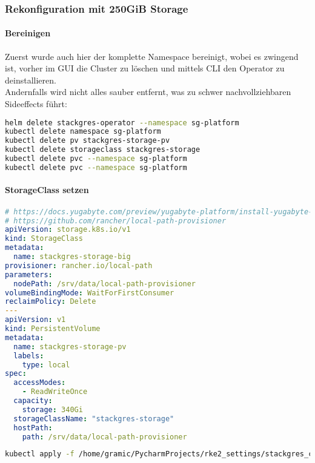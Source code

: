 \subsubsection{Rekonfiguration mit 250GiB Storage}
\paragraph{Bereinigen}
Zuerst wurde auch hier der komplette Namespace bereinigt, wobei es zwingend ist, vorher im GUI die Cluster zu löschen und mittels CLI den Operator zu deinstallieren.\\
Andernfalls wird nicht alles sauber entfernt, was zu schwer nachvollziehbaren Sideeffects führt:
\lstset{style=gra_codestyle}
\begin{lstlisting}[language=bash, caption=StackGres-Citus - Deinstallieren,captionpos=b,label={lst:stackgres_citus-deinstall-cleanup},breaklines=true]
helm delete stackgres-operator --namespace sg-platform
kubectl delete namespace sg-platform
kubectl delete pv stackgres-storage-pv
kubectl delete storageclass stackgres-storage
kubectl delete pvc --namespace sg-platform
kubectl delete pvc --namespace sg-platform
\end{lstlisting}

\paragraph{StorageClass setzen}
\lstset{style=gra_codestyle}
\begin{lstlisting}[language=yaml, caption=StackGres-Citus - StorageClass setzen,captionpos=b,label={lst:storageclass_big.yaml},breaklines=true]
# https://docs.yugabyte.com/preview/yugabyte-platform/install-yugabyte-platform/prepare-environment/kubernetes/#configure-storage-class
# https://github.com/rancher/local-path-provisioner
apiVersion: storage.k8s.io/v1
kind: StorageClass
metadata:
  name: stackgres-storage-big
provisioner: rancher.io/local-path
parameters:
  nodePath: /srv/data/local-path-provisioner
volumeBindingMode: WaitForFirstConsumer
reclaimPolicy: Delete
---
apiVersion: v1
kind: PersistentVolume
metadata:
  name: stackgres-storage-pv
  labels:
    type: local
spec:
  accessModes:
    - ReadWriteOnce
  capacity:
    storage: 340Gi
  storageClassName: "stackgres-storage"
  hostPath:
    path: /srv/data/local-path-provisioner
\end{lstlisting}

\lstset{style=gra_codestyle}
\begin{lstlisting}[language=bash, caption=StackGres-Citus - StorageClass / PersistentVolume Grosse Volumes aktivieren,captionpos=b,label={lst:stackgres_citus-storageclass-big-apply},breaklines=true]
kubectl apply -f /home/gramic/PycharmProjects/rke2_settings/stackgres_citus/stackgres_citus/storageclass_big.yaml
\end{lstlisting}

